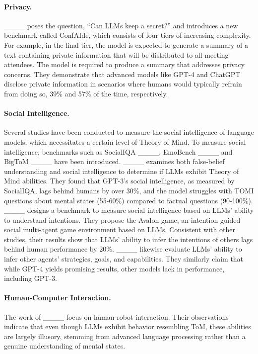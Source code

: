 \paragraph{Privacy.} ____ poses the question, ``Can LLMs keep a secret?'' and introduces a new benchmark called ConfAIde, which consists of four tiers of increasing complexity. For example, in the final tier, the model is expected to generate a summary of a text containing private information that will be distributed to all meeting attendees. The model is required to produce a summary that addresses privacy concerns. They demonstrate that advanced models like GPT-4 and ChatGPT disclose private information in scenarios where humans would typically refrain from doing so, 39\% and 57\% of the time, respectively.


\paragraph{Social Intelligence.}
Several studies have been conducted to measure the social intelligence of language models, which necessitates a certain level of Theory of Mind. To measure social intelligence, benchmarks such as SocialIQA ____, EmoBench ____ and BigToM ____ have been introduced. ____ examines both false-belief understanding and social intelligence to determine if LLMs exhibit Theory of Mind abilities. They found that GPT-3’s social intelligence, as measured by SocialIQA, lags behind humans by over 30\%, and the model struggles with TOMI questions about mental states (55-60\%) compared to factual questions (90-100\%). ____ designs a benchmark to measure social intelligence based on LLMs' ability to understand intentions. They propose the Avalon game, an intention-guided social multi-agent game environment based on LLMs. Consistent with other studies, their results show that LLMs' ability to infer the intentions of others lags behind human performance by 20\%. ____ likewise evaluate LLMs' ability to infer other agents' strategies, goals, and capabilities. They similarly claim that while GPT-4 yields promising results, other models lack in performance, including GPT-3.


\paragraph{Human-Computer Interaction.} The work of ____ focus on human-robot interaction. Their observations indicate that even though LLMs exhibit behavior resembling ToM, these abilities are largely illusory, stemming from advanced language processing rather than a genuine understanding of mental states.

